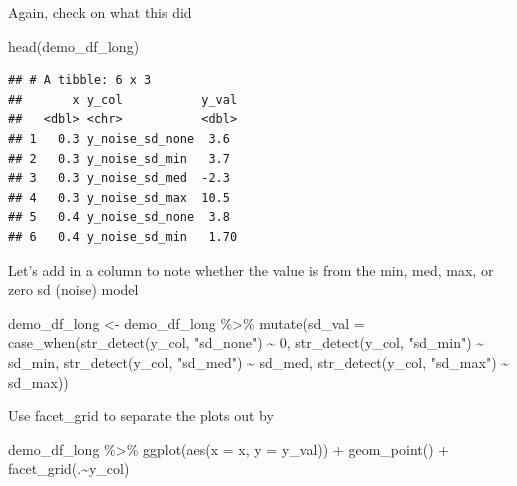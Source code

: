 \documentclass[
]{book}
\newenvironment{Shaded}{\begin{snugshade}}{\end{snugshade}}
\newcommand{\AttributeTok}[1]{\textcolor[rgb]{0.77,0.63,0.00}{#1}}
\newcommand{\DecValTok}[1]{\textcolor[rgb]{0.00,0.00,0.81}{#1}}
\newcommand{\FunctionTok}[1]{\textcolor[rgb]{0.00,0.00,0.00}{#1}}
\newcommand{\NormalTok}[1]{#1}
\newcommand{\OtherTok}[1]{\textcolor[rgb]{0.56,0.35,0.01}{#1}}
\newcommand{\SpecialCharTok}[1]{\textcolor[rgb]{0.00,0.00,0.00}{#1}}
\newcommand{\StringTok}[1]{\textcolor[rgb]{0.31,0.60,0.02}{#1}}
\begin{document}
Again, check on what this did

\begin{Shaded}
\begin{Highlighting}[]
\FunctionTok{head}\NormalTok{(demo\_df\_long)}
\end{Highlighting}
\end{Shaded}

\begin{verbatim}
## # A tibble: 6 x 3
##       x y_col           y_val
##   <dbl> <chr>           <dbl>
## 1   0.3 y_noise_sd_none  3.6 
## 2   0.3 y_noise_sd_min   3.7 
## 3   0.3 y_noise_sd_med  -2.3 
## 4   0.3 y_noise_sd_max  10.5 
## 5   0.4 y_noise_sd_none  3.8 
## 6   0.4 y_noise_sd_min   1.70
\end{verbatim}

Let's add in a column to note whether the value is from the min, med, max, or zero sd (noise) model

\begin{Shaded}
\begin{Highlighting}[]
\NormalTok{demo\_df\_long }\OtherTok{\textless{}{-}}\NormalTok{ demo\_df\_long }\SpecialCharTok{\%\textgreater{}\%} 
  \FunctionTok{mutate}\NormalTok{(}\AttributeTok{sd\_val =} \FunctionTok{case\_when}\NormalTok{(}\FunctionTok{str\_detect}\NormalTok{(y\_col, }\StringTok{"sd\_none"}\NormalTok{) }\SpecialCharTok{\textasciitilde{}} \DecValTok{0}\NormalTok{,}
                            \FunctionTok{str\_detect}\NormalTok{(y\_col, }\StringTok{"sd\_min"}\NormalTok{) }\SpecialCharTok{\textasciitilde{}}\NormalTok{ sd\_min,}
                            \FunctionTok{str\_detect}\NormalTok{(y\_col, }\StringTok{"sd\_med"}\NormalTok{) }\SpecialCharTok{\textasciitilde{}}\NormalTok{ sd\_med,}
                            \FunctionTok{str\_detect}\NormalTok{(y\_col, }\StringTok{"sd\_max"}\NormalTok{) }\SpecialCharTok{\textasciitilde{}}\NormalTok{ sd\_max))}
\end{Highlighting}
\end{Shaded}

Use facet\_grid to separate the plots out by

\begin{Shaded}
\begin{Highlighting}[]
\NormalTok{demo\_df\_long }\SpecialCharTok{\%\textgreater{}\%} 
  \FunctionTok{ggplot}\NormalTok{(}\FunctionTok{aes}\NormalTok{(}\AttributeTok{x =}\NormalTok{ x, }\AttributeTok{y =}\NormalTok{ y\_val)) }\SpecialCharTok{+}
  \FunctionTok{geom\_point}\NormalTok{() }\SpecialCharTok{+}
  \FunctionTok{facet\_grid}\NormalTok{(.}\SpecialCharTok{\textasciitilde{}}\NormalTok{y\_col)}
\end{Highlighting}
\end{Shaded}
\end{document}

